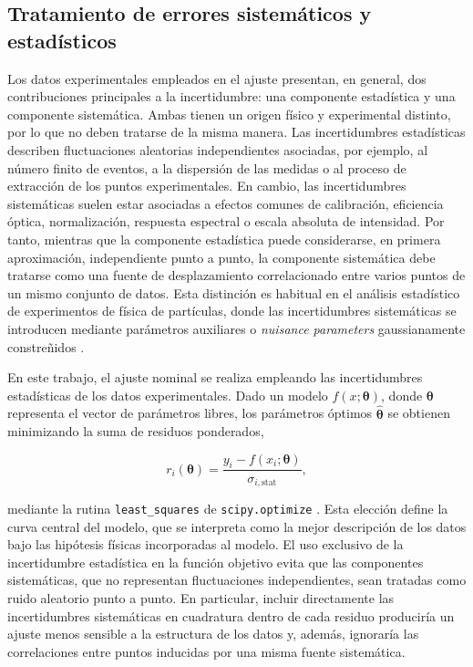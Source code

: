\documentclass[12pt,a4paper]{article}
\begin{document}
\subsection{Tratamiento de errores sistemáticos y estadísticos}

Los datos experimentales empleados en el ajuste presentan, en general, dos contribuciones principales a la incertidumbre: una componente estadística y una componente sistemática. Ambas tienen un origen físico y experimental distinto, por lo que no deben tratarse de la misma manera. Las incertidumbres estadísticas describen fluctuaciones aleatorias independientes asociadas, por ejemplo, al número finito de eventos, a la dispersión de las medidas o al proceso de extracción de los puntos experimentales. En cambio, las incertidumbres sistemáticas suelen estar asociadas a efectos comunes de calibración, eficiencia óptica, normalización, respuesta espectral o escala absoluta de intensidad. Por tanto, mientras que la componente estadística puede considerarse, en primera aproximación, independiente punto a punto, la componente sistemática debe tratarse como una fuente de desplazamiento correlacionado entre varios puntos de un mismo conjunto de datos. Esta distinción es habitual en el análisis estadístico de experimentos de física de partículas, donde las incertidumbres sistemáticas se introducen mediante parámetros auxiliares o \textit{nuisance parameters} gaussianamente constreñidos \cite{Barlow2002,Cowan2011,Conway2011,Cranmer2012HistFactory,PDGStatistics2024}.

En este trabajo, el ajuste nominal se realiza empleando las incertidumbres estadísticas de los datos experimentales. Dado un modelo $f(x;\boldsymbol{\theta})$, donde $\boldsymbol{\theta}$ representa el vector de parámetros libres, los parámetros óptimos $\hat{\boldsymbol{\theta}}$ se obtienen minimizando la suma de residuos ponderados,

\[
r_i(\boldsymbol{\theta})=
\frac{y_i-f(x_i;\boldsymbol{\theta})}
{\sigma_{i,\mathrm{stat}}},
\]

mediante la rutina \texttt{least\_squares} de \texttt{scipy.optimize} \cite{Virtanen2020SciPy}. Esta elección define la curva central del modelo, que se interpreta como la mejor descripción de los datos bajo las hipótesis físicas incorporadas al modelo. El uso exclusivo de la incertidumbre estadística en la función objetivo evita que las componentes sistemáticas, que no representan fluctuaciones independientes, sean tratadas como ruido aleatorio punto a punto. En particular, incluir directamente las incertidumbres sistemáticas en cuadratura dentro de cada residuo produciría un ajuste menos sensible a la estructura de los datos y, además, ignoraría las correlaciones entre puntos inducidas por una misma fuente sistemática.
\end{document}
